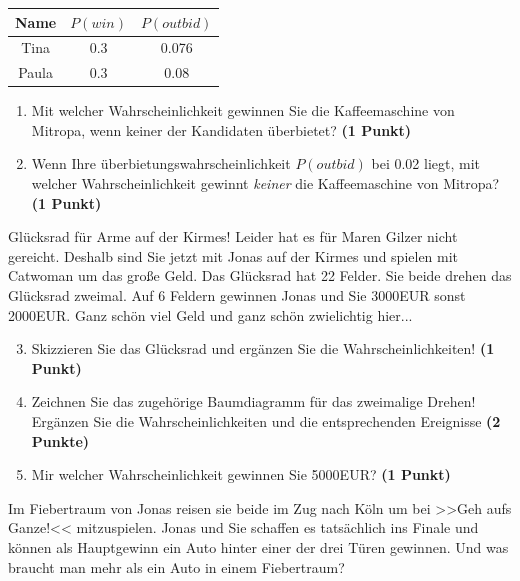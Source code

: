 \documentclass[a4paper, 9pt]{scrartcl}\usepackage[]{graphicx}\usepackage[]{xcolor}
\begin{document}
\begin{center}
\begin{tabular}{ccc}
  \toprule
  Name & $P(win)$ & $P(outbid)$\\
  \midrule
  Tina & 0.3 & 0.076\\
  Paula & 0.3 & 0.08 \\
  \bottomrule
\end{tabular}
\end{center}

\begin{enumerate}
\item Mit welcher Wahrscheinlichkeit gewinnen Sie die Kaffeemaschine von Mitropa, wenn keiner der Kandidaten überbietet? \textbf{(1 Punkt)}
\item Wenn Ihre überbietungswahrscheinlichkeit $P(outbid)$ bei 0.02 liegt, mit welcher Wahrscheinlichkeit gewinnt \textit{keiner} die Kaffeemaschine von Mitropa? \textbf{(1 Punkt)}
\end{enumerate}

Glücksrad für Arme auf der Kirmes! Leider hat es für Maren Gilzer nicht gereicht. Deshalb sind Sie jetzt mit Jonas auf der Kirmes und spielen mit Catwoman um das große Geld. Das Glücksrad hat 22 Felder. Sie beide drehen das Glücksrad zweimal. Auf 6 Feldern gewinnen Jonas und Sie 3000EUR sonst 2000EUR. Ganz schön viel Geld und ganz schön zwielichtig hier...

\begin{enumerate}
  \setcounter{enumi}{2}  
\item Skizzieren Sie das Glücksrad und ergänzen Sie die Wahrscheinlichkeiten! \textbf{(1 Punkt)}
\item Zeichnen Sie das zugehörige Baumdiagramm für das zweimalige Drehen! Ergänzen Sie die Wahrscheinlichkeiten und die entsprechenden Ereignisse \textbf{(2 Punkte)}
\item Mir welcher Wahrscheinlichkeit gewinnen Sie 5000EUR? \textbf{(1 Punkt)}
\end{enumerate}

Im Fiebertraum von Jonas reisen sie beide im Zug nach Köln um bei >>Geh aufs Ganze!<< mitzuspielen. Jonas und Sie schaffen es tatsächlich ins Finale und können als Hauptgewinn ein Auto hinter einer der drei Türen gewinnen. Und was braucht man mehr als ein Auto in einem Fiebertraum? 
\end{document}
